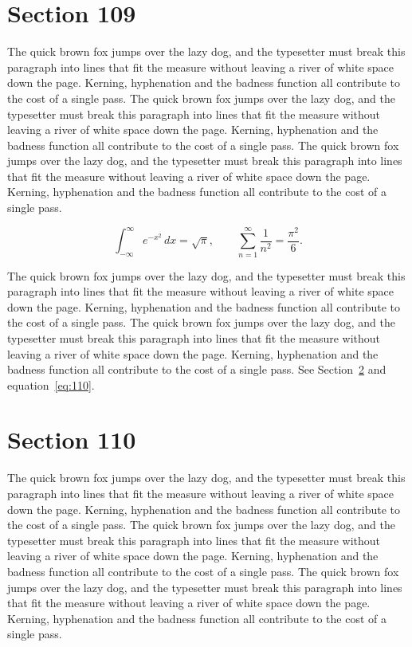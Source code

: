 \documentclass{article}
\begin{document}
\section{Section 109}
\label{sec:109}
The quick brown fox jumps over the lazy dog, and the typesetter must break this paragraph into lines that fit the measure without leaving a river of white space down the page. Kerning, hyphenation and the badness function all contribute to the cost of a single pass. The quick brown fox jumps over the lazy dog, and the typesetter must break this paragraph into lines that fit the measure without leaving a river of white space down the page. Kerning, hyphenation and the badness function all contribute to the cost of a single pass. The quick brown fox jumps over the lazy dog, and the typesetter must break this paragraph into lines that fit the measure without leaving a river of white space down the page. Kerning, hyphenation and the badness function all contribute to the cost of a single pass. 

\begin{equation}\label{eq:109}
\int_{-\infty}^{\infty} e^{-x^{2}}\,dx = \sqrt{\pi}, \qquad
\sum_{n=1}^{\infty} \frac{1}{n^{2}} = \frac{\pi^{2}}{6}.
\end{equation}

The quick brown fox jumps over the lazy dog, and the typesetter must break this paragraph into lines that fit the measure without leaving a river of white space down the page. Kerning, hyphenation and the badness function all contribute to the cost of a single pass. The quick brown fox jumps over the lazy dog, and the typesetter must break this paragraph into lines that fit the measure without leaving a river of white space down the page. Kerning, hyphenation and the badness function all contribute to the cost of a single pass. 
See Section~\ref{sec:110} and equation~\eqref{eq:110}.
\section{Section 110}
\label{sec:110}
The quick brown fox jumps over the lazy dog, and the typesetter must break this paragraph into lines that fit the measure without leaving a river of white space down the page. Kerning, hyphenation and the badness function all contribute to the cost of a single pass. The quick brown fox jumps over the lazy dog, and the typesetter must break this paragraph into lines that fit the measure without leaving a river of white space down the page. Kerning, hyphenation and the badness function all contribute to the cost of a single pass. The quick brown fox jumps over the lazy dog, and the typesetter must break this paragraph into lines that fit the measure without leaving a river of white space down the page. Kerning, hyphenation and the badness function all contribute to the cost of a single pass. 
\end{document}
